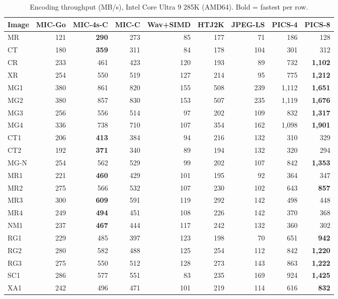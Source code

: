 \documentclass[journal]{IEEEtran}
\begin{document}
\begin{table}[htbp]
\centering
\caption{Encoding throughput (MB/s), Intel Core Ultra 9 285K (AMD64). Bold =
fastest per row.}
\label{tab:enc-amd64}
\scriptsize
\begin{tabular}{lrrrrrrrr}
\toprule
Image & MIC-Go & MIC-4s-C & MIC-C & Wav+SIMD & HTJ2K & JPEG-LS & PICS-4 & PICS-8 \\
\midrule
MR  & 121 & \textbf{290} & 273 & 85 & 177 & 71 & 186 & 128 \\
CT  & 180 & \textbf{359} & 311 & 84 & 178 & 104 & 301 & 312 \\
CR  & 233 & 461 & 423 & 120 & 193 & 89 & 732 & \textbf{1,102} \\
XR  & 254 & 550 & 519 & 127 & 214 & 95 & 775 & \textbf{1,212} \\
MG1 & 380 & 861 & 820 & 155 & 508 & 239 & 1,112 & \textbf{1,651} \\
MG2 & 380 & 857 & 830 & 153 & 507 & 235 & 1,119 & \textbf{1,676} \\
MG3 & 256 & 556 & 514 & 97 & 202 & 109 & 832 & \textbf{1,317} \\
MG4 & 336 & 738 & 710 & 107 & 354 & 162 & 1,098 & \textbf{1,901} \\
CT1 & 206 & \textbf{413} & 384 & 94 & 216 & 132 & 310 & 329 \\
CT2 & 192 & \textbf{371} & 340 & 89 & 194 & 132 & 320 & 294 \\
MG-N & 254 & 562 & 529 & 99 & 202 & 107 & 842 & \textbf{1,353} \\
MR1 & 221 & \textbf{460} & 429 & 101 & 195 & 92 & 364 & 347 \\
MR2 & 275 & 566 & 532 & 107 & 230 & 102 & 643 & \textbf{857} \\
MR3 & 300 & \textbf{609} & 591 & 119 & 292 & 142 & 498 & 448 \\
MR4 & 249 & \textbf{494} & 451 & 108 & 226 & 142 & 370 & 368 \\
NM1 & 237 & \textbf{467} & 444 & 117 & 242 & 132 & 360 & 302 \\
RG1 & 229 & 485 & 397 & 123 & 198 & 70 & 651 & \textbf{942} \\
RG2 & 280 & 582 & 488 & 125 & 254 & 112 & 842 & \textbf{1,220} \\
RG3 & 275 & 550 & 512 & 128 & 273 & 143 & 863 & \textbf{1,222} \\
SC1 & 286 & 577 & 551 & 83 & 235 & 169 & 924 & \textbf{1,425} \\
XA1 & 242 & 496 & 471 & 101 & 219 & 114 & 616 & \textbf{832} \\
\bottomrule
\end{tabular}
\end{table}
\end{document}
